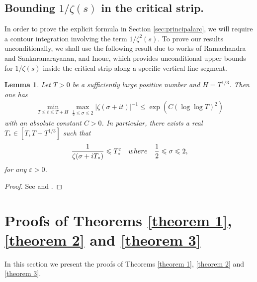\documentclass[11pt]{amsart}
\numberwithin{equation}{section}
\numberwithin{figure}{section}
\newtheorem{lemma}{Lemma}[section]
\theoremstyle{definition}
\begin{document}
\subsection{Bounding $1/\zeta(s)$ in the critical strip.}
In order to prove the explicit formula in Section \ref{sec:principalarc}, we will require a contour integration involving the term $1/\zeta^2(s)$. To prove our results unconditionally, we shall use the following result due to works of Ramachandra and Sankaranarayanan, and Inoue, which provides unconditional upper bounds for $1/\zeta(s)$ inside the critical strip along a specific vertical line segment.
\begin{lemma} \label{lem:RamachandraSankaranarayanan}
Let $T>0$ be a sufficiently large positive number and $H=T^{1/3}$. Then one has
\begin{align*}
        \min_{T \leqslant t \leqslant T+H} \max_{\frac{1}{2} \leqslant \sigma \leqslant 2} |\zeta(\sigma+it)|^{-1} \leqslant \exp( C (\log \log T)^2)
\end{align*}
with an absolute constant $C>0$. In particular, there exists a real $T_* \in [T,T+T^{1/3}]$ such that
\begin{align*}
        \frac{1}{\zeta(\sigma+iT_*)} \leqslant T_*^\varepsilon \quad \textnormal{where} \quad \frac{1}{2} \leqslant \sigma \leqslant 2,
\end{align*}
for any $\varepsilon>0$.
\end{lemma}
\begin{proof}
See \cite[Theorem 2]{RamachandraSankaranarayanan} and \cite[Lemma 1]{Inoue}.
\end{proof}
\section{Proofs of Theorems \ref{theorem 1}, \ref{theorem 2} and \ref{theorem 3}} \label{sec:proofsexpsums}
In this section we present the proofs of Theorems \ref{theorem 1}, \ref{theorem 2} and \ref{theorem 3}.
\end{document}
